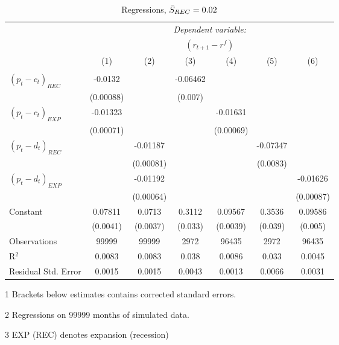 \begin{table}[H]
\centering   
  \caption{Regressions, $\Bar{S}_{REC} = 0.02$}           
  \label{tab:regress1}     
  \begin{threeparttable}
\begin{tabular}{@{\hspace{5pt}}l@{\hspace{5pt}}cccccc} 
\toprule 
 & \multicolumn{6}{c}{\textit{Dependent variable:}} \\ 
 & \multicolumn{6}{c}{$\left(r_{t+1}-r^f\right)$} \\ 
 \cmidrule(rr){2-7}
 & (1) & (2) & (3) & (4) & (5) & (6) \\ 
\midrule  
\\[-2.1ex] $\left( p_t - c_t \right)_{REC}$ &-0.0132& &-0.06462 & & &\\ 
  & (0.00088) & &(0.007) & & & \\ 
 \addlinespace 
  $\left( p_t - c_t \right)_{EXP}$ &-0.01323  &    & &-0.01631 & &  \\ 
  & (0.00071) & & &(0.00069) & & \\ 
 \addlinespace 
  $\left( p_t - d_t \right)_{REC}$ & &-0.01187& & & -0.07347  &   \\ 
                                   & &  (0.00081) & & & (0.0083) &    \\ 
 \addlinespace 
  $\left( p_t - d_t \right)_{EXP}$ & &   -0.01192& & & &-0.01626 \\ 
                                   & &  (0.00064) & & & &(0.00087) \\ 
 \addlinespace 
 Constant &0.07811 &0.0713&0.3112 &0.09567 &0.3536 &0.09586 \\ 
          &(0.0041) &(0.0037)&(0.033)&(0.0039)&(0.039)&(0.005) \\ 
 \addlinespace 
\midrule  
Observations & 99999 & 99999&2972 & 96435&2972&96435\\
R$^{2}$ &0.0083 & 0.0083&0.038&0.0086&0.033&0.0045 \\ 
Residual Std. Error &0.0015 & 0.0015&0.0043&0.0013&0.0066&0.0031 \\ 
\bottomrule 
\end{tabular} 
\begin{tablenotes}
\footnotesize{
\item[1] Brackets below estimates contains \citet{NW87} corrected standard errors. 
\item[2] Regressions on 99999 months of simulated data.
\item[3] EXP (REC) denotes expansion (recession)
}
\end{tablenotes}
\end{threeparttable}
\end{table} 
